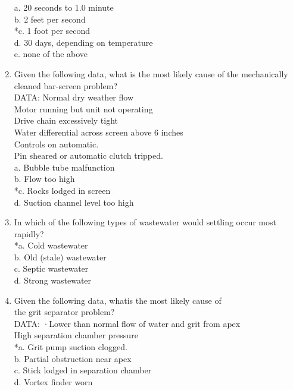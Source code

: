 \begin{enumerate}
a. 20 seconds to 1.0 minute \\
b. 2 feet per second \\
*c. 1 foot per second \\
d. 30 days, depending on temperature \\
e. none of the above 

\vspace{0.4cm}
\item  Given the following data, what is the most likely cause of the mechanically cleaned bar-screen problem?\\
DATA: Normal dry weather flow\\
Motor running but unit not operating\\
Drive chain excessively tight\\
Water differential across screen above 6 inches\\
Controls on automatic.\\
Pin sheared or automatic clutch tripped. \\

a. Bubble tube malfunction \\
b. Flow too high \\
*c. Rocks lodged in screen \\
d. Suction channel level too high 

\vspace{0.4cm}
\item  In which of the following types of wastewater would settling occur most rapidly? \\

*a. Cold wastewater \\
b. Old (stale) wastewater \\
c. Septic wastewater \\
d. Strong wastewater 

\vspace{0.4cm}
\item  Given the following data, whatis the most likely cause of\\
the grit separator problem?\\
DATA: ·Lower than normal flow of water and grit from apex\\
High separation chamber pressure \\

*a. Grit pump suction clogged. \\
b. Partial obstruction near apex \\
c. Stick lodged in separation chamber \\
d. Vortex finder worn 


\end{enumerate}

